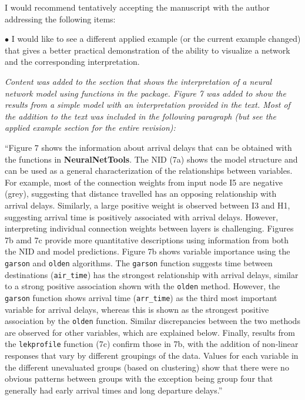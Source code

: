 \documentclass[letterpaper,12pt]{article}
\begin{document}
I would recommend tentatively accepting the manuscript with the author addressing the following items:

$\bullet$ I would like to see a different applied example (or the current example changed) that gives a better practical demonstration of the ability to visualize a network and the corresponding interpretation.

{\it Content was added to the section that shows the interpretation of a neural network model using functions in the package.  Figure 7 was added to show the results from a simple model with an interpretation provided in the text.  Most of the addition to the text was included in the following paragraph (but see the applied example section for the entire revision): 

``Figure 7 shows the information about arrival delays that can be obtained with the functions in \textbf{NeuralNetTools}. The NID (7a) shows the model structure and can be used as a general characterization of the relationships between variables.  For example, most of the connection weights from input node I5 are negative (grey), suggesting that distance travelled has an opposing relationship with arrival delays. Similarly, a large positive weight is observed between I3 and H1, suggesting arrival time is positively associated with arrival delays.  However, interpreting individual connection weights between layers is challenging.  Figures 7b amd 7c provide more quantitative descriptions using information from both the NID and model predictions.  Figure 7b shows variable importance using the \texttt{garson} and \texttt{olden} algorithms.  The \texttt{garson} function suggests time between destinations (\texttt{air\_time}) has the strongest relationship with arrival delays, similar to a strong positive association shown with the \texttt{olden} method.  However, the \texttt{garson} function shows arrival time (\texttt{arr\_time}) as the third most important variable for arrival delays, whereas this is shown as the strongest positive association by the \texttt{olden} function. Similar discrepancies between the two methods are observed for other variables, which are explained below. Finally, results from the \texttt{lekprofile} function (7c) confirm those in 7b, with the addition of non-linear responses that vary by different groupings of the data.  Values for each variable in the different unevaluated groups (based on clustering) show that there were no obvious patterns between groups with the exception being group four that generally had early arrival times and long departure delays.''    
}
\end{document}
